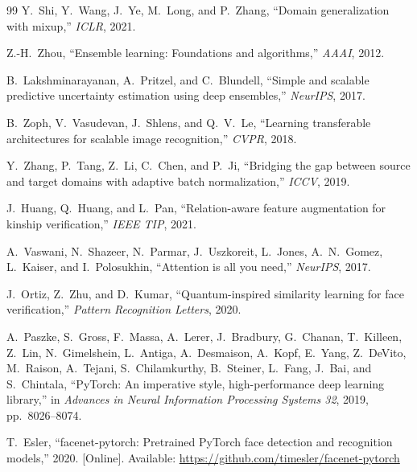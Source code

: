 \documentclass[journal,12pt]{IEEEtran}
\begin{document}
\begin{thebibliography}{99}
Y.~Shi, Y.~Wang, J.~Ye, M.~Long, and P.~Zhang,
``Domain generalization with mixup,'' \textit{ICLR}, 2021.

Z.-H.~Zhou,
``Ensemble learning: Foundations and algorithms,''
\textit{AAAI}, 2012.

B.~Lakshminarayanan, A.~Pritzel, and C.~Blundell,
``Simple and scalable predictive uncertainty estimation using deep
ensembles,'' \textit{NeurIPS}, 2017.

B.~Zoph, V.~Vasudevan, J.~Shlens, and Q.~V.~Le,
``Learning transferable architectures for scalable image recognition,''
\textit{CVPR}, 2018.

Y.~Zhang, P.~Tang, Z.~Li, C.~Chen, and P.~Ji,
``Bridging the gap between source and target domains with adaptive batch
normalization,'' \textit{ICCV}, 2019.

J.~Huang, Q.~Huang, and L.~Pan,
``Relation-aware feature augmentation for kinship verification,''
\textit{IEEE TIP}, 2021.

A.~Vaswani, N.~Shazeer, N.~Parmar, J.~Uszkoreit, L.~Jones, A.~N.~Gomez,
L.~Kaiser, and I.~Polosukhin,
``Attention is all you need,'' \textit{NeurIPS}, 2017.

J.~Ortiz, Z.~Zhu, and D.~Kumar,
``Quantum-inspired similarity learning for face verification,''
\textit{Pattern Recognition Letters}, 2020.

A.~Paszke, S.~Gross, F.~Massa, A.~Lerer, J.~Bradbury, G.~Chanan,
T.~Killeen, Z.~Lin, N.~Gimelshein, L.~Antiga, A.~Desmaison, A.~Kopf,
E.~Yang, Z.~DeVito, M.~Raison, A.~Tejani, S.~Chilamkurthy,
B.~Steiner, L.~Fang, J.~Bai, and S.~Chintala,
``PyTorch: An imperative style, high-performance deep learning library,''
in \textit{Advances in Neural Information Processing Systems 32},
2019, pp.~8026--8074.

T.~Esler,
``facenet-pytorch: Pretrained PyTorch face detection and recognition
models,'' 2020. [Online]. Available:
\url{https://github.com/timesler/facenet-pytorch}

\end{thebibliography}

\appendix
\end{document}

